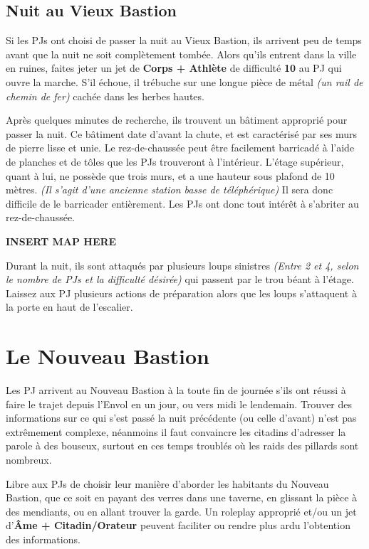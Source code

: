 \documentclass[10pt,twoside,twocolumn,openany,bg=print,justified]{dndbook}
\begin{document}
\subsection*{Nuit au Vieux Bastion}

Si les PJs ont choisi de passer la nuit au Vieux Bastion, ils arrivent peu de temps avant que la nuit ne soit complètement tombée. Alors qu'ils entrent dans la ville en ruines, faites jeter un jet de \textbf{Corps + Athlète} de difficulté \textbf{10} au PJ qui ouvre la marche. S'il échoue, il trébuche sur une longue pièce de métal \textit{(un rail de chemin de fer)} cachée dans les herbes hautes.

Après quelques minutes de recherche, ils trouvent un bâtiment approprié pour passer la nuit. Ce bâtiment date d'avant la chute, et est caractérisé par ses murs de pierre lisse et unie. Le rez-de-chaussée peut être facilement barricadé à l'aide de planches et de tôles que les PJs trouveront à l'intérieur. L'étage supérieur, quant à lui, ne possède que trois murs, et a une hauteur sous plafond de 10 mètres. \textit{(Il s'agit d'une ancienne station basse de téléphérique)} Il sera donc difficile de le barricader entièrement. Les PJs ont donc tout intérêt à s'abriter au rez-de-chaussée.

\textbf{INSERT MAP HERE}

Durant la nuit, ils sont attaqués par plusieurs loups sinistres \textit{(Entre 2 et 4, selon le nombre de PJs et la difficulté désirée)} qui passent par le trou béant à l'étage. Laissez aux PJ plusieurs actions de préparation alors que les loups s'attaquent à la porte en haut de l'escalier.

\section{Le Nouveau Bastion}

Les PJ arrivent au Nouveau Bastion à la toute fin de journée s'ils ont réussi à faire le trajet depuis l'Envol en un jour, ou vers midi le lendemain. Trouver des informations sur ce qui s'est passé la nuit précédente (ou celle d'avant) n'est pas extrêmement complexe, néanmoins il faut convaincre les citadins d'adresser la parole à des bouseux, surtout en ces temps troublés où les raids des pillards sont nombreux.

Libre aux PJs de choisir leur manière d'aborder les habitants du Nouveau Bastion, que ce soit en payant des verres dans une taverne, en glissant la pièce à des mendiants, ou en allant trouver la garde. Un roleplay approprié et/ou un jet d'\textbf{Âme + Citadin/Orateur} peuvent faciliter ou rendre plus ardu l'obtention des informations.
\end{document}
